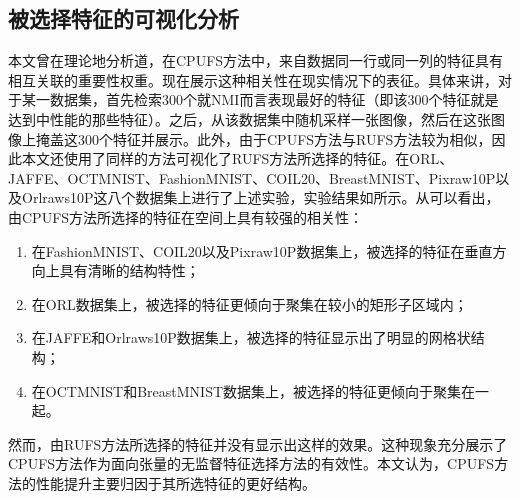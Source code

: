 \subsection{被选择特征的可视化分析}\label{sec:visualization}
本文曾在理论地分析道，在CPUFS方法中，来自数据同一行或同一列的特征具有相互关联的重要性权重。现在展示这种相关性在现实情况下的表征。具体来讲，对于某一数据集，首先检索$300$个就NMI而言表现最好的特征（即该$300$个特征就是达到中性能的那些特征）。之后，从该数据集中随机采样一张图像，然后在这张图像上掩盖这$300$个特征并展示。此外，由于CPUFS方法与RUFS方法较为相似，因此本文还使用了同样的方法可视化了RUFS方法所选择的特征。在ORL、JAFFE、OCTMNIST、FashionMNIST、COIL20、BreastMNIST、Pixraw10P以及Orlraws10P这八个数据集上进行了上述实验，实验结果如所示。从可以看出，由CPUFS方法所选择的特征在空间上具有较强的相关性：
\begin{enumerate}
    \item 在FashionMNIST、COIL20以及Pixraw10P数据集上，被选择的特征在垂直方向上具有清晰的结构特性；
    \item 在ORL数据集上，被选择的特征更倾向于聚集在较小的矩形子区域内；
    \item 在JAFFE和Orlraws10P数据集上，被选择的特征显示出了明显的网格状结构；
    \item 在OCTMNIST和BreastMNIST数据集上，被选择的特征更倾向于聚集在一起。
\end{enumerate}
然而，由RUFS方法所选择的特征并没有显示出这样的效果。这种现象充分展示了CPUFS方法作为面向张量的无监督特征选择方法的有效性。本文认为，CPUFS方法的性能提升主要归因于其所选特征的更好结构。

